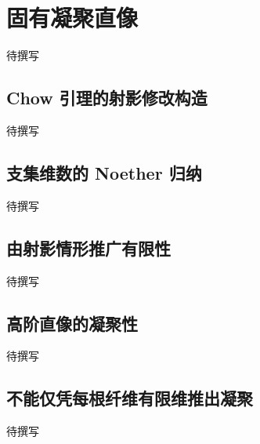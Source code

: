 
% 
% 
% 
% 

\section{固有凝聚直像}
\label{g5:sec:1904}

待撰写

\subsection{Chow 引理的射影修改构造}
\label{g5:subsec:1904:01}
待撰写

\subsection{支集维数的 Noether 归纳}
\label{g5:subsec:1904:02}
待撰写

\subsection{由射影情形推广有限性}
\label{g5:subsec:1904:03}
待撰写

\subsection{高阶直像的凝聚性}
\label{g5:subsec:1904:04}
待撰写

\subsection{不能仅凭每根纤维有限维推出凝聚}
\label{g5:subsec:1904:05}
待撰写
